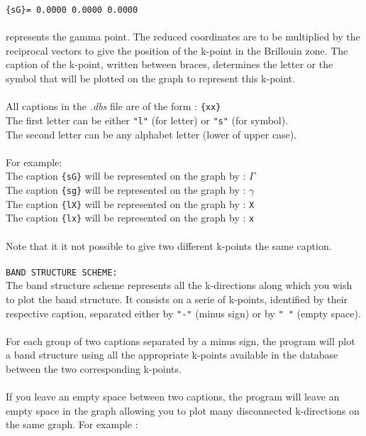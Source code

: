 \documentclass{article}
\begin{document}
\texttt{\{sG\}= 0.0000  0.0000  0.0000} \\
\\
represents the gamma point. The reduced coordinates are to be multiplied by the reciprocal vectors to give the position of the k-point in the Brillouin zone. The caption of the k-point, written between braces, determines the letter or the symbol that will be plotted on the graph to represent this k-point. \\
\\
All captions in the \textit{.dbs} file are of the form : \texttt{\{xx\}} \\
The first letter can be either \texttt{"l"} (for letter) or \texttt{"s"} (for symbol). \\
The second letter can be any alphabet letter (lower of upper case). \\
\\
For example: \\
The caption \texttt{\{sG\}} will be represented on the graph by : $\Gamma$ \\
The caption \texttt{\{sg\}} will be represented on the graph by : $\gamma$ \\
The caption \texttt{\{lX\}} will be represented on the graph by : \texttt{X} \\
The caption \texttt{\{lx\}} will be represented on the graph by : \texttt{x} \\
\\
Note that it it not possible to give two different k-points the same caption. \\
\\
\texttt{BAND STRUCTURE SCHEME:} \\
The band structure scheme represents all the k-directions along which you wish to plot the band structure. It consists on a serie of k-points, identified by their respective caption, separated either by \texttt{"-"} (minus sign) or by \texttt{" "} (empty space). \\
\\
For each group of two captions separated by a minus sign, the program will plot a band structure using all the appropriate k-points available in the database between the two corresponding k-points. \\
\\
If you leave an empty space between two captions, the program will leave an empty space in the graph allowing you to plot many disconnected k-directions on the same graph. For example : \\
\end{document}
